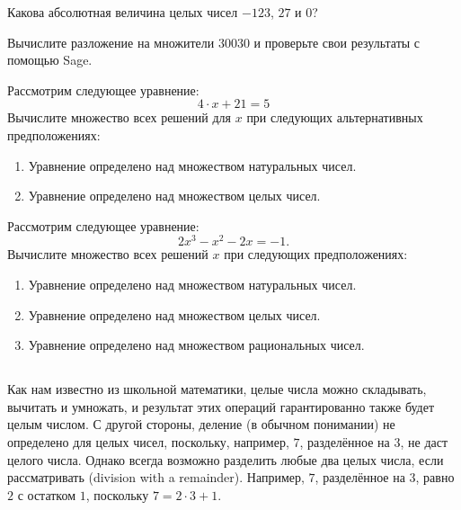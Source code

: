 \begin{exercise}
Какова абсолютная величина целых чисел $-123$, $27$ и $0$?
\end{exercise}
\begin{exercise}
Вычислите разложение на множители $30030$ и проверьте свои результаты с помощью Sage.
\end{exercise}
\begin{exercise}
Рассмотрим следующее уравнение:
\begin{equation*}4\cdot x + 21 = 5\end{equation*}
Вычислите множество всех решений для $x$ при следующих альтернативных предположениях:
\begin{enumerate}
\item Уравнение определено над множеством натуральных чисел.
\item Уравнение определено над множеством целых чисел.
\end{enumerate}
\end{exercise}
\begin{exercise}
Рассмотрим следующее уравнение:
\begin{equation*} 2 x^3 - x^2 - 2 x = - 1.\end{equation*}
Вычислите множество всех решений $x$ при следующих предположениях:
\begin{enumerate}
\item Уравнение определено над множеством натуральных чисел.
\item Уравнение определено над множеством целых чисел.
\item Уравнение определено над множеством рациональных чисел.
\end{enumerate}
\end{exercise}

\subsection{}
\label{Euclidean_division}
Как нам известно из школьной математики, целые числа можно складывать, вычитать и умножать, и результат этих операций гарантированно также будет целым числом.
С другой стороны, деление (в обычном понимании) не определено для целых чисел, поскольку, например, $7$, разделённое на $3$, не даст целого числа. Однако всегда возможно разделить любые два целых числа, если рассматривать  (division with a remainder). Например, $7$, разделённое на $3$, равно $2$ с остатком $1$, поскольку $7 = 2\cdot 3 + 1$.

